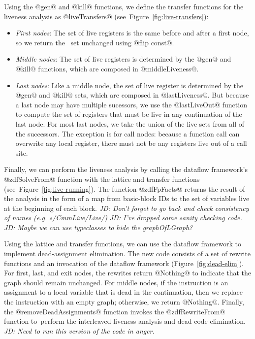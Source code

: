 \documentclass[blockstyle,preprint,nocopyrightspace]{sigplanconf}
\newcommand{\authornote}[1]{{\em #1}}
\newcommand{\john}[1]{\authornote{JD: #1}}
\newcommand\figref[1]{Figure~\ref{fig:#1}}
\begin{document}
Using the @gen@ and @kill@ functions, we define the 
transfer functions for the liveness analysis as @liveTransfers@
(see~\figref{live-transfers}):
\begin{itemize}
\item \emph{First nodes}:
  The set of live registers is the same before and after a first node,
  so we return the \liveout\ set unchanged using @flip const@.
\item \emph{Middle nodes}:
  The set of live registers is determined by the @gen@ and @kill@
  functions, which are composed in @middleLiveness@.
\item \emph{Last nodes}:
  Like a middle node, the set of live register is determined by
  the @gen@ and @kill@ sets, which are composed in @lastLiveness@.
  But because a last node may have multiple sucessors,
  we use the @lastLiveOut@ function to compute the set of registers that
  must be live in any continuation of the last node.
  For most last nodes, we take the union of the live sets from all of the successors.
  The exception is for call nodes: because a function call can overwrite any
  local register, there must not be any registers live out of a call site.
\end{itemize}

Finally, we can perform the liveness analysis by calling the dataflow framework's
@zdfSolveFrom@ function with the lattice
and transfer functions (see~\figref{live-running}).
The function @zdfFpFacts@ returns the result of the analysis
in the form of a map from basic-block IDs to the set of variables
live at the beginning of each block.
\john{Don't forget to go back and check consistency of names (e.g. s/CmmLive/Live/)}
\john{I've dropped some sanity checking code.}
\john{Maybe we can use typeclasses to hide the graphOfLGraph?}

Using the lattice and transfer functions,
we can use the dataflow framework to implement dead-assignment elimination.
The new code consists of a set of rewrite functions and an invocation
of the dataflow framework (\figref{dead-elim}).
For first, last, and exit nodes, the rewrites return @Nothing@ to indicate
that the graph should remain unchanged.
For middle nodes, if the instruction is an assignment to a local variable
that is dead in the continuation,
then we replace the instruction with an empty graph;
otherwise, we return @Nothing@.
Finally, the @removeDeadAssignments@ function invokes the @zdfRewriteFrom@ function
to~perform the interleaved liveness analysis and dead-code elimination.
\john{Need to run this version of the code in anger.}
\end{document}
